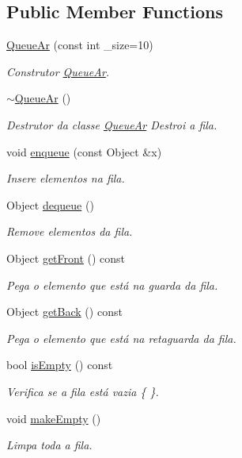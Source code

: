 \subsection*{Public Member Functions}
\begin{DoxyCompactItemize}
\item 
\hyperlink{class_queue_ar_aff2b7644e32ec281d312939aa775faec}{Queue\+Ar} (const int \+\_\+size=10)
\begin{DoxyCompactList}\small\item\em Construtor \hyperlink{class_queue_ar}{Queue\+Ar}. \end{DoxyCompactList}\item 
\hyperlink{class_queue_ar_a4f5e5ac9bcc103787ddf13247c401819}{$\sim$\+Queue\+Ar} ()\hypertarget{class_queue_ar_a4f5e5ac9bcc103787ddf13247c401819}{}\label{class_queue_ar_a4f5e5ac9bcc103787ddf13247c401819}

\begin{DoxyCompactList}\small\item\em Destrutor da classe \hyperlink{class_queue_ar}{Queue\+Ar} Destroi a fila. \end{DoxyCompactList}\item 
void \hyperlink{class_queue_ar_a4d5801295edee5f26a730ae8e2bc0675}{enqueue} (const Object \&x)
\begin{DoxyCompactList}\small\item\em Insere elementos na fila. \end{DoxyCompactList}\item 
Object \hyperlink{class_queue_ar_aa8bef4597ae7b4efbaec8f6866eb8342}{dequeue} ()
\begin{DoxyCompactList}\small\item\em Remove elementos da fila. \end{DoxyCompactList}\item 
Object \hyperlink{class_queue_ar_ad79382827047677e605fe2c905792edb}{get\+Front} () const 
\begin{DoxyCompactList}\small\item\em Pega o elemento que está na guarda da fila. \end{DoxyCompactList}\item 
Object \hyperlink{class_queue_ar_a5c9bd4407de280c789c18a25ccb61a5b}{get\+Back} () const 
\begin{DoxyCompactList}\small\item\em Pega o elemento que está na retaguarda da fila. \end{DoxyCompactList}\item 
bool \hyperlink{class_queue_ar_adc5f98078020d631ac866fffc19d6d28}{is\+Empty} () const 
\begin{DoxyCompactList}\small\item\em Verifica se a fila está vazia \{ \}. \end{DoxyCompactList}\item 
void \hyperlink{class_queue_ar_ae95415c3620c41922ec87a778d6b55fb}{make\+Empty} ()
\begin{DoxyCompactList}\small\item\em Limpa toda a fila. \end{DoxyCompactList}\end{DoxyCompactItemize}

